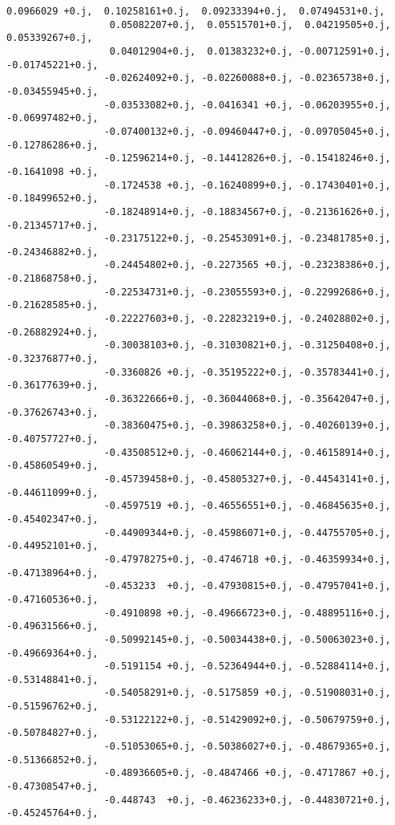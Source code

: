 \documentclass[11pt]{article}
\begin{document}
\begin{Verbatim}[commandchars=\\\{\}]
                  0.0966029 +0.j,  0.10258161+0.j,  0.09233394+0.j,  0.07494531+0.j,
                  0.05082207+0.j,  0.05515701+0.j,  0.04219505+0.j,  0.05339267+0.j,
                  0.04012904+0.j,  0.01383232+0.j, -0.00712591+0.j, -0.01745221+0.j,
                 -0.02624092+0.j, -0.02260088+0.j, -0.02365738+0.j, -0.03455945+0.j,
                 -0.03533082+0.j, -0.0416341 +0.j, -0.06203955+0.j, -0.06997482+0.j,
                 -0.07400132+0.j, -0.09460447+0.j, -0.09705045+0.j, -0.12786286+0.j,
                 -0.12596214+0.j, -0.14412826+0.j, -0.15418246+0.j, -0.1641098 +0.j,
                 -0.1724538 +0.j, -0.16240899+0.j, -0.17430401+0.j, -0.18499652+0.j,
                 -0.18248914+0.j, -0.18834567+0.j, -0.21361626+0.j, -0.21345717+0.j,
                 -0.23175122+0.j, -0.25453091+0.j, -0.23481785+0.j, -0.24346882+0.j,
                 -0.24454802+0.j, -0.2273565 +0.j, -0.23238386+0.j, -0.21868758+0.j,
                 -0.22534731+0.j, -0.23055593+0.j, -0.22992686+0.j, -0.21628585+0.j,
                 -0.22227603+0.j, -0.22823219+0.j, -0.24028802+0.j, -0.26882924+0.j,
                 -0.30038103+0.j, -0.31030821+0.j, -0.31250408+0.j, -0.32376877+0.j,
                 -0.3360826 +0.j, -0.35195222+0.j, -0.35783441+0.j, -0.36177639+0.j,
                 -0.36322666+0.j, -0.36044068+0.j, -0.35642047+0.j, -0.37626743+0.j,
                 -0.38360475+0.j, -0.39863258+0.j, -0.40260139+0.j, -0.40757727+0.j,
                 -0.43508512+0.j, -0.46062144+0.j, -0.46158914+0.j, -0.45860549+0.j,
                 -0.45739458+0.j, -0.45805327+0.j, -0.44543141+0.j, -0.44611099+0.j,
                 -0.4597519 +0.j, -0.46556551+0.j, -0.46845635+0.j, -0.45402347+0.j,
                 -0.44909344+0.j, -0.45986071+0.j, -0.44755705+0.j, -0.44952101+0.j,
                 -0.47978275+0.j, -0.4746718 +0.j, -0.46359934+0.j, -0.47138964+0.j,
                 -0.453233  +0.j, -0.47930815+0.j, -0.47957041+0.j, -0.47160536+0.j,
                 -0.4910898 +0.j, -0.49666723+0.j, -0.48895116+0.j, -0.49631566+0.j,
                 -0.50992145+0.j, -0.50034438+0.j, -0.50063023+0.j, -0.49669364+0.j,
                 -0.5191154 +0.j, -0.52364944+0.j, -0.52884114+0.j, -0.53148841+0.j,
                 -0.54058291+0.j, -0.5175859 +0.j, -0.51908031+0.j, -0.51596762+0.j,
                 -0.53122122+0.j, -0.51429092+0.j, -0.50679759+0.j, -0.50784827+0.j,
                 -0.51053065+0.j, -0.50386027+0.j, -0.48679365+0.j, -0.51366852+0.j,
                 -0.48936605+0.j, -0.4847466 +0.j, -0.4717867 +0.j, -0.47308547+0.j,
                 -0.448743  +0.j, -0.46236233+0.j, -0.44830721+0.j, -0.45245764+0.j,

\end{Verbatim}
\end{document}
